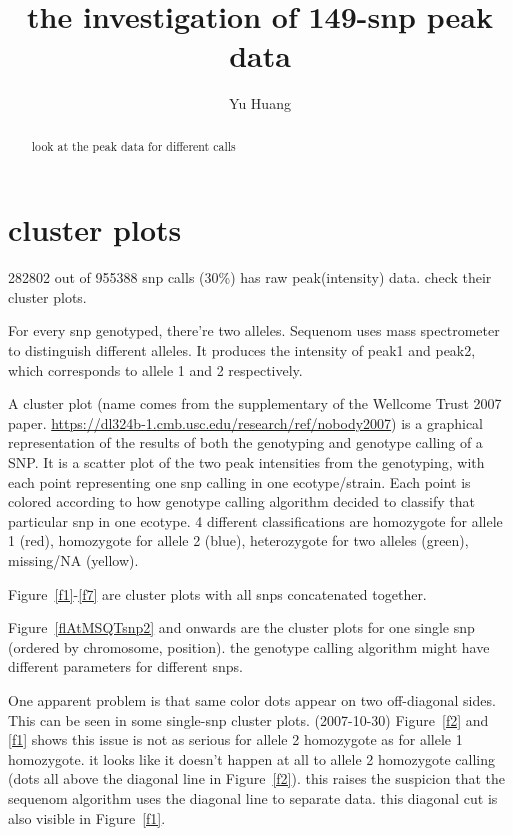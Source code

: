 \documentclass[a4paper,10pt]{article}
\title{the investigation of 149-snp peak data}
\author{Yu Huang}
\begin{document}
\maketitle

\begin{abstract}
look at the peak data for different calls
\end{abstract}

\tableofcontents


\section{cluster plots}
282802 out of 955388 snp calls (30\%) has raw peak(intensity) data. check their cluster plots.

For every snp genotyped, there're two alleles. Sequenom uses mass spectrometer to distinguish different alleles. It produces the intensity of peak1 and peak2, which corresponds to allele 1 and 2 respectively.

A cluster plot (name comes from the supplementary of the Wellcome Trust 2007 paper. \url{https://dl324b-1.cmb.usc.edu/research/ref/nobody2007}) is a graphical representation of the results of both the genotyping and genotype calling of a SNP. It is a scatter plot of the two peak intensities from the genotyping, with each point representing one snp calling in one ecotype/strain. Each point is colored according to how genotype calling algorithm decided to classify that particular snp in one ecotype. 4 different classifications are homozygote for allele 1 (red), homozygote for allele 2 (blue), heterozygote for two alleles (green), missing/NA (yellow).

Figure~\ref{f1}-\ref{f7} are cluster plots with all snps concatenated together.

Figure~\ref{flAtMSQTsnp2} and onwards are the cluster plots for one single snp (ordered by chromosome, position). the genotype calling algorithm might have different parameters for different snps.

One apparent problem is that same color dots appear on two off-diagonal sides. This can be seen in some single-snp cluster plots. (2007-10-30) Figure~\ref{f2} and \ref{f1} shows this issue is not as serious for allele 2 homozygote as for allele 1 homozygote. it looks like it doesn't happen at all to allele 2 homozygote calling (dots all above the diagonal line in Figure~\ref{f2}). this  raises the suspicion that the sequenom algorithm uses the diagonal line to separate data. this diagonal cut is also visible in Figure~\ref{f1}.
\end{document}
